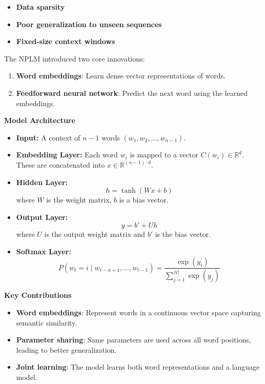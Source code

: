 \begin{itemize}
    \item \textbf{Data sparsity}
    \item \textbf{Poor generalization to unseen sequences}
    \item \textbf{Fixed-size context windows}
\end{itemize}

The NPLM introduced two core innovations:

\begin{enumerate}
    \item \textbf{Word embeddings}: Learn dense vector representations of words.
    \item \textbf{Feedforward neural network}: Predict the next word using the learned embeddings.
\end{enumerate}

\textbf{Model Architecture}

\begin{itemize}
    \item \textbf{Input:} A context of $n-1$ words $(w_1, w_2, \ldots, w_{n-1})$.
    \item \textbf{Embedding Layer:} Each word $w_i$ is mapped to a vector $C(w_i) \in \mathbb{R}^d$. These are concatenated into $x \in \mathbb{R}^{(n-1) \cdot d}$.
    \item \textbf{Hidden Layer:}
    \[
        h = \tanh(Wx + b)
    \]
    where $W$ is the weight matrix, $b$ is a bias vector.
    \item \textbf{Output Layer:}
    \[
        y = b' + Uh
    \]
    where $U$ is the output weight matrix and $b'$ is the bias vector.
    \item \textbf{Softmax Layer:}
    \[
        P(w_t = i \mid w_{t-n+1}, \ldots, w_{t-1}) = \frac{\exp(y_i)}{\sum_{j=1}^{|V|} \exp(y_j)}
    \]
\end{itemize}

\textbf{Key Contributions}

\begin{itemize}
    \item \textbf{Word embeddings}: Represent words in a continuous vector space capturing semantic similarity.
    \item \textbf{Parameter sharing}: Same parameters are used across all word positions, leading to better generalization.
    \item \textbf{Joint learning}: The model learns both word representations and a language model.
\end{itemize}

